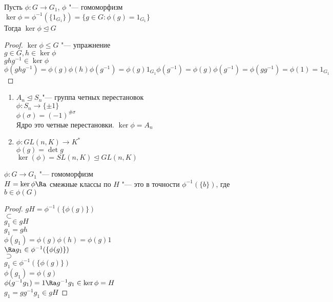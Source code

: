 \begin{theorem}
Пусть $\phi\colon G \to G_1$, $\phi$ "--- гомоморфизм\\
$\ker \phi = \phi^{-1}(\{1_{G_1}\}) = \{g \in G \colon \phi(g) = 1_{G_1}\}$ \\
Тогда $\ker \phi \unlhd G$\\
\end{theorem}
\begin{proof}
$\ker \phi \le G$ "--- упражнение\\
$g \in G, h \in \ker \phi$\\
$ghg^{-1} \in \ker \phi$\\
$\phi(ghg^{-1}) = \phi(g)\phi(h)\phi(g^{-1}) = \phi(g)1_{G_1}\phi(g^{-1}) = \phi(g)\phi(g^{-1}) = \phi(gg^{-1}) = \phi(1) = 1_{G_1}$\\
\end{proof}
\begin{exmp}\hfill
\begin{enumerate} 
\item
$A_n \unlhd S_n$"--- группа четных перестановок\\
$\phi \colon S_n \to \{\pm 1\}$\\
$\phi(\sigma) = (-1)^{\#\sigma}$ \\
Ядро это четные перестановки.
$\ker \phi  = A_n$

\item 
$\phi \colon GL(n,K) \to K^*$\\
$\phi(g) = \det g$\\
$\ker(\phi) = SL(n, K) \unlhd GL(n, K)$\\
\end{enumerate}
\end{exmp}

\begin{lemma}
$\phi\colon G \to G_1$ "--- гомоморфизм\\
$H = \ker \phi \Ra$ смежные классы по $H$ "--- это в точности $\phi^{-1}(\{b\})$, где $b \in \phi(G)$\\
\end{lemma}
\begin{proof}
$gH = \phi^{-1}(\{\phi(g)\})$\\
$\subset$\\
$g_1 \in gH$\\
$g_1 = gh$\\
$\phi(g_1) = \phi(g)\phi(h) = \phi(g)1$ \\
$\Ra g_1 \in \phi^{-1}(\{\phi(g)\})$\\
$\supset$\\
$g_1 \in \phi^{-1}(\{\phi(g)\})$ \\
$\phi(g_1) = \phi(g)$\\
$\phi(g^{-1}g_1) = 1 \Ra g^{-1}g_1 \in \ker \phi = H$\\
$g_1 = gg^{-1}g_1 \in gH$
\end{proof}


